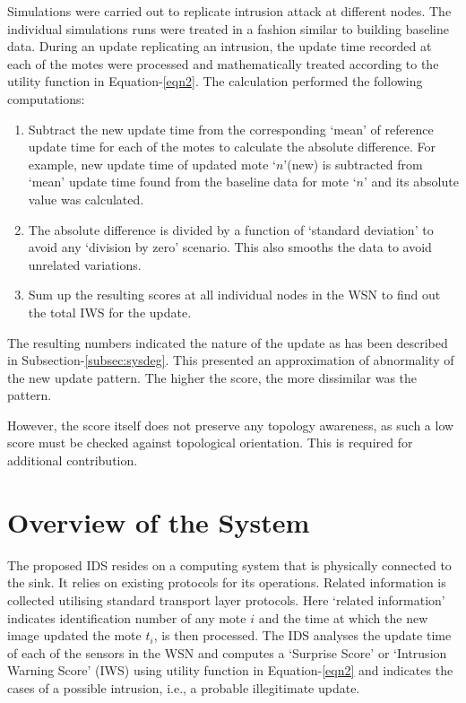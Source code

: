 \documentclass[conference,final]{IEEEtran}
\begin{document}
Simulations were carried out to replicate intrusion attack at different nodes.
The individual simulations runs were treated in a fashion  similar to building baseline data.
During an update replicating an intrusion, the update time recorded at each of the motes were processed  and mathematically treated according to the utility function in Equation-\ref{eqn2}. The calculation performed the following computations:
\begin{enumerate}
\item Subtract the new update time from the corresponding `mean' of reference update time for each of the motes to calculate the absolute difference. For example, new update time of updated mote `$n$'(new) is subtracted from `mean' update time found from the baseline data for mote `$n$' and its absolute value was calculated.
\item The absolute difference is divided by a function of `standard deviation' to avoid any `division by zero' scenario. This also smooths the data to avoid unrelated variations.
\item Sum up the resulting scores at all individual nodes in the WSN to find out the total IWS for the update.
\end{enumerate}
The resulting numbers indicated the nature of the update as has been described in Subsection-\ref{subsec:sysdeg}.
This presented an approximation of abnormality of the new update pattern. The higher the score, the more dissimilar was the pattern. 

However, the score itself does not preserve any topology awareness, as such a low score must be checked against topological orientation.
This is required for additional contribution.


\section{Overview of the System}
\label{sec:des}
The proposed IDS resides on a computing system that is physically connected to the sink.
It relies on existing protocols for its operations.
Related information is collected utilising standard transport layer protocols. 
Here `related information' indicates identification number of any mote $i$ and the time at which the new image updated the mote $t_i$, is then processed.
The IDS analyses the update time of  each of the sensors in the WSN and computes a `Surprise Score' or `Intrusion Warning Score' (IWS) using utility function in Equation-\ref{eqn2} and indicates the cases of a possible intrusion, i.e., a probable illegitimate update.
\end{document}
